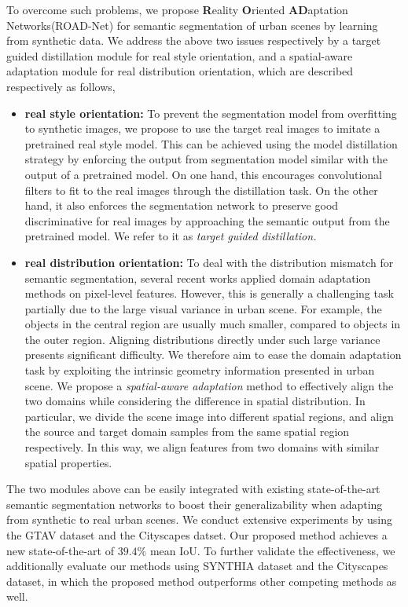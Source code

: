 \documentclass[10pt,twocolumn,letterpaper]{article}
\begin{document}
To overcome such problems, we propose \textbf{R}eality \textbf{O}riented \textbf{AD}aptation Networks(ROAD-Net) for semantic segmentation of urban scenes by learning from synthetic data. We address the above two issues respectively by a target guided distillation module for real style orientation, and a spatial-aware adaptation module for real distribution orientation, which are described respectively as follows,  
\begin{itemize}
\item \textbf{real style orientation: } To prevent the segmentation model from overfitting to  synthetic images, we propose to use the target real images to imitate a pretrained real style model. This can be achieved using the model distillation strategy by enforcing the output from segmentation model similar with the output of a pretrained model. On one hand, this encourages convolutional filters to fit to the real images through the distillation task. On the other hand, it also enforces the segmentation network to preserve good discriminative for real images by approaching the semantic output from the pretrained model. We refer to it as \textit{target guided distillation.} 
\item \textbf{real distribution orientation: } To deal with the distribution mismatch for semantic segmentation, several recent works \cite{hoffman2016fcns,zhang2017curriculum} applied domain adaptation methods on pixel-level features. However, this is generally a challenging task partially due to the large visual variance in urban scene. For example, the objects in the central region are usually much smaller, compared to objects in the outer region. Aligning distributions directly under such large variance presents significant difficulty. We therefore aim to ease the domain adaptation task by exploiting the intrinsic geometry information presented in urban scene. We propose a \textit{spatial-aware adaptation} method to effectively align the two domains while considering the difference in spatial distribution. In particular, we divide the scene image into different spatial regions, and align the source and target domain samples from the same spatial region respectively. In this way, we align features from two domains with similar spatial properties.
\end{itemize}
The two modules above can be easily integrated with existing state-of-the-art semantic segmentation networks to boost their generalizability when adapting from synthetic to real urban scenes. We conduct extensive experiments by using the GTAV dataset and the Cityscapes datset. Our proposed method achieves a new state-of-the-art of $39.4\%$ mean IoU. To further validate the effectiveness, we additionally evaluate our methods using SYNTHIA dataset and the Cityscapes dataset, in which the proposed method outperforms other competing methods as well.
\end{document}
